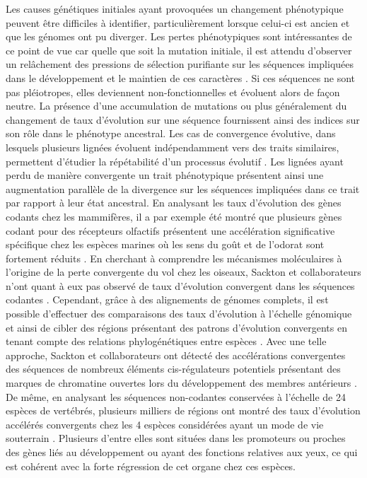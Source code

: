 Les causes génétiques initiales ayant provoquées un changement phénotypique peuvent être difficiles à identifier, particulièrement lorsque celui-ci est ancien et que les génomes ont pu diverger. Les pertes phénotypiques sont intéressantes de ce point de vue car quelle que soit la mutation initiale, il est attendu d’observer un relâchement des pressions de sélection purifiante sur les séquences impliquées dans le développement et le maintien de ces caractères \citep{hiller_forward_2012, roscito_phenotype_2018}. Si ces séquences ne sont pas pléiotropes, elles deviennent non-fonctionnelles et évoluent alors de façon neutre. La présence d’une accumulation de mutations ou plus généralement du changement de taux d’évolution sur une séquence fournissent ainsi des indices sur son rôle dans le phénotype ancestral. Les cas de convergence évolutive, dans lesquels plusieurs lignées évoluent indépendamment vers des traits similaires, permettent d’étudier la répétabilité d’un processus évolutif \citep{sackton_convergent_2019}. Les lignées ayant perdu de manière convergente un trait phénotypique présentent ainsi une augmentation parallèle de la divergence sur les séquences impliquées dans ce trait par rapport à leur état ancestral. En analysant les taux d’évolution des gènes codants chez les mammifères, il a par exemple été montré que plusieurs gènes codant pour des récepteurs olfactifs présentent une accélération significative spécifique chez les espèces marines où les sens du goût et de l’odorat sont fortement réduits \citep{chikina_hundreds_2016}. En cherchant à comprendre les mécanismes moléculaires à l’origine de la perte convergente du vol chez les oiseaux, Sackton et collaborateurs n’ont quant à eux pas observé de taux d'évolution convergent dans les séquences codantes \citep{sackton_convergent_2019}. Cependant, grâce à des alignements de génomes complets, il est possible d’effectuer des comparaisons des taux d’évolution à l’échelle génomique et ainsi de cibler des régions présentant des patrons d’évolution convergents en tenant compte des relations phylogénétiques entre espèces \citep{hiller_forward_2012,prudent_controlling_2016, partha_robust_2019}. Avec une telle approche, Sackton et collaborateurs ont détecté des accélérations convergentes des séquences de nombreux éléments \acrshort{cis}-régulateurs potentiels présentant des marques de chromatine ouvertes lors du développement des membres antérieurs \citep{sackton_convergent_2019}. De même, en analysant  les séquences non-codantes conservées à l’échelle de 24 espèces de vertébrés, plusieurs milliers de régions ont montré des taux d’évolution accélérés convergents chez les 4 espèces considérées ayant un mode de vie souterrain \citep{roscito_phenotype_2018}. Plusieurs d’entre elles sont situées dans les promoteurs ou proches des gènes liés au développement ou ayant des fonctions relatives aux yeux, ce qui est cohérent avec la forte régression de cet organe chez ces espèces.\\

